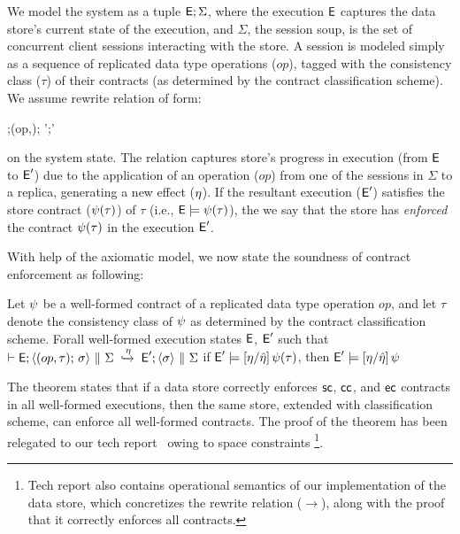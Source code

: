 We model the system as a tuple ${\normalfont \textsf{E}};\Sigma$, where the execution ${\normalfont \textsf{E}}$
captures the data store's current state of the execution, and
$\Sigma$, the session soup, is the set of concurrent client sessions
interacting with the store. A session is modeled simply as a sequence
of replicated data type operations ($op$), tagged with the consistency
class ($\tau$) of their contracts (as determined by the contract
classification scheme). We assume rewrite relation of form:

\vspace{-1.7em}
\begin{smathpar}
  \auxred{} {\E;\langle (op,\tau);\sigma \rangle \pll \Sigma} {\eff}
    {\E';\langle \sigma \rangle \pll \Sigma'}
\end{smathpar}

\noindent on the system state. The relation captures store's progress
in execution (from ${\normalfont \textsf{E}}$ to ${\normalfont \textsf{E}}'$) due to the application of an
operation ($op$) from one of the sessions in $\Sigma$ to a replica,
generating a new effect ($\eta$). If the resultant execution (${\normalfont \textsf{E}}'$)
satisfies the store contract ($\psi(\tau)$) of $\tau$ (i.e., ${\normalfont \textsf{E}}
\models \psi(\tau)$), the we say that the store has \emph{enforced} the
contract $\psi(\tau)$ in the execution ${\normalfont \textsf{E}}'$.

With help of the axiomatic model, we now state the soundness of
contract enforcement as following:

\begin{theorem}
\label{lem:core-preservation}
Let $\psi$ be a well-formed contract of a replicated data type operation $op$,
and let $\tau$ denote the consistency class of $\psi$ as determined by
the contract classification scheme. Forall well-formed execution
states ${\normalfont \textsf{E}}$, ${\normalfont \textsf{E}}'$ such that
$\vdash {\normalfont \textsf{E}};\langle (op,\tau);\,\sigma \rangle ~\|~ \Sigma \;\xhookrightarrow{\eta}\; {\normalfont \textsf{E}}';\langle \sigma \rangle ~\|~ \Sigma$
if ${\normalfont \textsf{E}}' \models [\eta/\hat{\eta}]\,\psi(\tau)$, then ${\normalfont \textsf{E}}' \models [\eta/\hat{\eta}]\,\psi$
\end{theorem}

The theorem states that if a data store correctly enforces ${\sf sc}$,
${\sf cc}$, and ${\sf ec}$ contracts in all well-formed executions, then the
same store, extended with classification scheme, can enforce all
well-formed \name contracts. The proof of the theorem has been
relegated to our tech report~\cite{techrep} owing to space
constraints \footnote{Tech report also contains operational semantics of our
implementation of the data store, which concretizes the rewrite
relation ($\xrightarrow{}$), along with the proof that it correctly
enforces all \name contracts.}.


